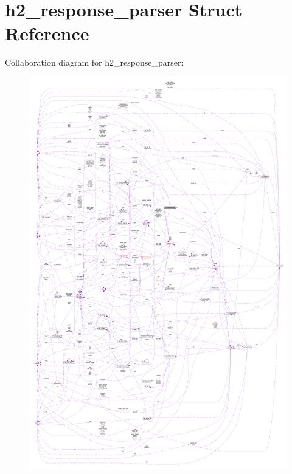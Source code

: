\hypertarget{structh2__response__parser}{}\section{h2\+\_\+response\+\_\+parser Struct Reference}
\label{structh2__response__parser}


Collaboration diagram for h2\+\_\+response\+\_\+parser\+:
\nopagebreak
\begin{figure}[H]
\begin{center}
\leavevmode
\includegraphics[width=350pt]{structh2__response__parser__coll__graph}
\end{center}
\end{figure}
